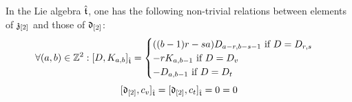         \begin{lemma} \label{lemma: explicit_commutators_between_central_basis_elements_and_derivations}
            In the Lie algebra $\hat{\mathfrak{t}}$, one has the following non-trivial relations between elements of $\mathfrak{z}_{[2]}$ and those of $\mathfrak{d}_{[2]}$:
                $$
                    \forall (a, b) \in \mathbb{Z}^2: [D, K_{a, b}]_{\hat{\mathfrak{t}}} =
                    \begin{cases}
                        \text{$((b - 1)r - sa) D_{a - r, b - s - 1}$ if $D = D_{r, s}$}
                        \\
                        \text{$-r K_{a, b - 1}$ if $D = D_v$}
                        \\
                        \text{$- D_{a, b - 1}$ if $D = D_t$}
                    \end{cases}
                $$
                $$[\mathfrak{d}_{[2]}, c_v]_{\hat{\mathfrak{t}}} = [\mathfrak{d}_{[2]}, c_t]_{\hat{\mathfrak{t}}} = 0 = 0$$
        \end{lemma}
